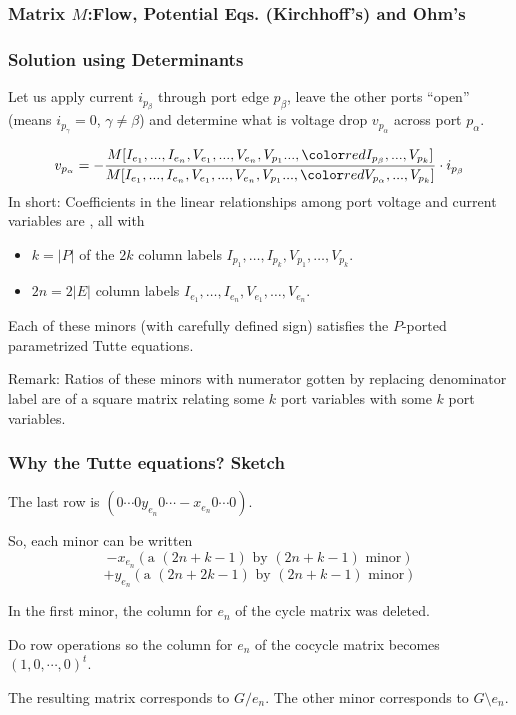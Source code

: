 \documentclass{beamer}
\begin{document}
\begin{frame}
\frametitle{Matrix $M$:Flow, Potential Eqs. (Kirchhoff's) and Ohm's}

\end{frame}

\begin{frame}
\frametitle{Solution using Determinants}
Let us apply current $i_{p_{\beta}}$ through port edge $p_{\beta}$,
leave the other ports ``open'' (means $i_{p_{\gamma}}=0$, $\gamma\neq\beta$)
and determine what is voltage drop $v_{p_{\alpha}}$ across port $p_{\alpha}$.

\[
v_{p_{\alpha}}=-\frac{M[I_{e_1},...,I_{e_n},V_{e_1},...,V_{e_n},
                V_{p_1}...,\Remph{I_{p_{\beta}}},...,V_{p_k}]}
                   {M[I_{e_1},...,I_{e_n},V_{e_1},...,V_{e_n},
                V_{p_1}...,\Remph{V_{p_{\alpha}}},...,V_{p_k}]}
                  \cdot i_{p_{\beta}}
\]
In short: Coefficients in the linear relationships among port voltage
and current variables are ,
all with
\begin{itemize}
\item $k=|P|$ of the $2k$ column labels 
$I_{p_1},\ldots,I_{p_k},V_{p_1},\ldots,V_{p_k}$.
\item
{} $2n=2|E|$ column labels
$I_{e_1},\ldots,I_{e_n},V_{e_1},\ldots,V_{e_n}$.
\end{itemize}

\begin{theorem}
Each of these minors (with carefully defined sign)
satisfies the $P$-ported parametrized
Tutte equations.
\end{theorem}

Remark: Ratios of these minors with numerator gotten by replacing 
 denominator label are 
of a square matrix relating some $k$ port variables with some
$k$ port variables.

\end{frame}


\begin{frame}
\frametitle{Why the Tutte equations? Sketch}

The last row is $(0 \cdots 0 y_{e_n} 0 \cdots -x_{e_n} 0 \cdots 0)$.

So, each minor can be written 
\[
-x_{e_n}(\text{a }(2n+k-1)\text{ by }(2n+k-1)\text{ minor})
\]
\[
+y_{e_n}(\text{a }(2n+2k-1)\text{ by }(2n+k-1)\text{ minor})
\]

In the first minor, the column for $e_n$ of the cycle matrix was deleted.

Do row operations so the column for $e_n$ of the cocycle matrix becomes
$(1,0,\cdots,0)^t$.

The resulting matrix corresponds to $G/e_n$.  The other minor
corresponds to $G\!\setminus\! e_n$.
\end{frame}
\end{document}
